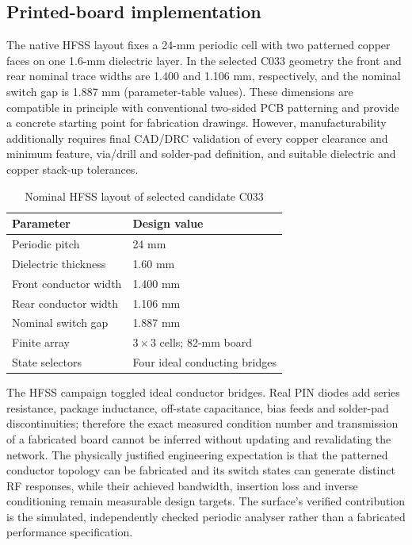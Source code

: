\documentclass{ieeeaccess}
\begin{document}
\subsection{Printed-board implementation}
The native HFSS layout fixes a 24-mm periodic cell with two patterned copper faces on one 1.6-mm dielectric layer. In the selected C033 geometry the front and rear nominal trace widths are 1.400 and 1.106 mm, respectively, and the nominal switch gap is 1.887 mm (parameter-table values). These dimensions are compatible in principle with conventional two-sided PCB patterning and provide a concrete starting point for fabrication drawings. However, manufacturability additionally requires final CAD/DRC validation of every copper clearance and minimum feature, via/drill and solder-pad definition, and suitable dielectric and copper stack-up tolerances.

\begin{table}[t]
\caption{Nominal HFSS layout of selected candidate C033}
\label{tab:pcb_specs}
\centering\footnotesize
\begin{tabular}{@{}ll@{}}
\toprule
Parameter & Design value \\
\midrule
Periodic pitch & 24 mm \\
Dielectric thickness & 1.60 mm \\
Front conductor width & 1.400 mm \\
Rear conductor width & 1.106 mm \\
Nominal switch gap & 1.887 mm \\
Finite array & $3\times3$ cells; 82-mm board \\
State selectors & Four ideal conducting bridges \\
\bottomrule
\end{tabular}
\end{table}

The HFSS campaign toggled ideal conductor bridges. Real PIN diodes add series resistance, package inductance, off-state capacitance, bias feeds and solder-pad discontinuities; therefore the exact measured condition number and transmission of a fabricated board cannot be inferred without updating and revalidating the network. The physically justified engineering expectation is that the patterned conductor topology can be fabricated and its switch states can generate distinct RF responses, while their achieved bandwidth, insertion loss and inverse conditioning remain measurable design targets. The surface's verified contribution is the simulated, independently checked periodic analyser rather than a fabricated performance specification.
\end{document}
